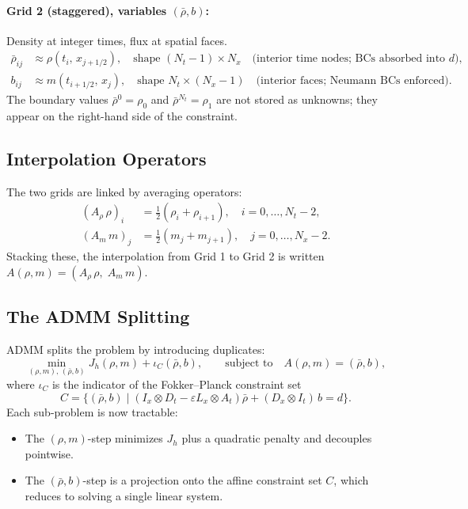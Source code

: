 \documentclass[11pt]{article}
\begin{document}
\paragraph{Grid 2 (staggered), variables $(\bar\rho, b)$:}
Density at integer times, flux at spatial faces.
\begin{align*}
  \bar\rho_{ij} &\approx \rho(t_i,\, x_{j+1/2}),\quad
    \text{shape } (N_t-1) \times N_x
    \quad\text{(interior time nodes; BCs absorbed into } d\text{)},\\
  b_{ij}        &\approx m(t_{i+1/2},\, x_j),\quad
    \text{shape } N_t \times (N_x - 1)
    \quad\text{(interior faces; Neumann BCs enforced)}.
\end{align*}
The boundary values $\bar\rho^0 = \rho_0$ and $\bar\rho^{N_t} = \rho_1$ are
not stored as unknowns; they appear on the right-hand side of the constraint.

\subsection{Interpolation Operators}

The two grids are linked by averaging operators:
\begin{align}
  (A_\rho\,\rho)_i     &= \tfrac{1}{2}(\rho_i + \rho_{i+1}), \quad
    i = 0,\ldots,N_t-2,
    \label{eq:Arho}\\
  (A_m\, m)_j          &= \tfrac{1}{2}(m_j + m_{j+1}), \quad
    j = 0,\ldots,N_x-2.
    \label{eq:Am}
\end{align}
Stacking these, the interpolation from Grid 1 to Grid 2 is written
$A(\rho,m) = (A_\rho\,\rho,\; A_m\,m)$.

\subsection{The ADMM Splitting}

ADMM splits the problem by introducing duplicates:
\begin{equation}
  \min_{(\rho,m),\,(\bar\rho,b)}
  J_h(\rho, m) + \iota_C(\bar\rho, b),
  \qquad
  \text{subject to}\quad
  A(\rho, m) = (\bar\rho, b),
  \label{eq:split}
\end{equation}
where $\iota_C$ is the indicator of the Fokker--Planck constraint set
\begin{equation}
  C = \bigl\{(\bar\rho, b) \mid
    (I_x \otimes D_t - \varepsilon L_x \otimes A_t)\bar\rho
    + (D_x \otimes I_t)\,b = d\bigr\}.
  \label{eq:C}
\end{equation}
Each sub-problem is now tractable:
\begin{itemize}
  \item The $(\rho, m)$-step minimizes $J_h$ plus a quadratic penalty and
        decouples pointwise.
  \item The $(\bar\rho, b)$-step is a projection onto the affine constraint
        set $C$, which reduces to solving a single linear system.
\end{itemize}
\end{document}
